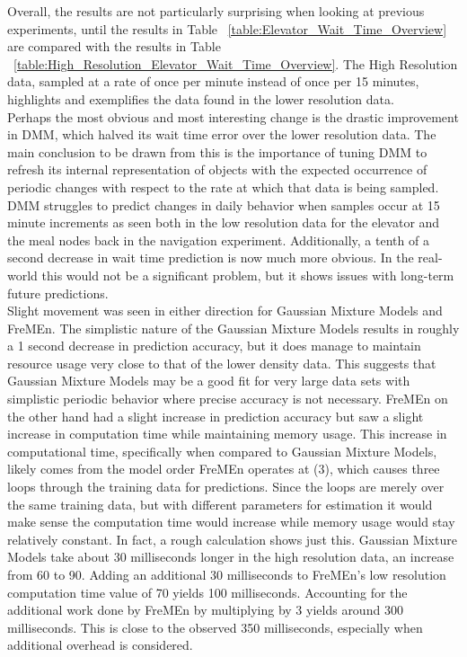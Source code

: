 \begin{center}
Overall, the results are not particularly surprising when looking at previous
experiments, until the results in Table
~\ref{table:Elevator_Wait_Time_Overview} are compared with the results in Table
~\ref{table:High_Resolution_Elevator_Wait_Time_Overview}. The High Resolution
data, sampled at a rate of once per minute instead of once per 15 minutes,
highlights and exemplifies the data found in the lower resolution data. \\

Perhaps the most obvious and most interesting change is the drastic improvement
in DMM, which halved its wait time error over the lower resolution data.
The main conclusion to be drawn from this is the importance of tuning DMM
to refresh its internal representation of objects with the expected occurrence
of periodic changes with respect to the rate at which that data is being
sampled. DMM struggles to predict changes in daily behavior when samples
occur at 15 minute increments as seen both in the low resolution data for the
elevator and the meal nodes back in the navigation experiment.
Additionally, a tenth of a second decrease in wait time prediction is now much more obvious.
In the real-world this would not be a significant problem,
but it shows issues with long-term future predictions. \\

Slight movement was seen in either direction for Gaussian Mixture Models and
FreMEn. The simplistic nature of the Gaussian Mixture Models results in roughly
a 1 second decrease in prediction accuracy, but it does manage to maintain resource
usage very close to that of the lower density data. This suggests that Gaussian
Mixture Models may be a good fit for very large data sets with simplistic
periodic behavior where precise accuracy is not necessary. FreMEn on the other
hand had a slight increase in prediction accuracy but saw a slight increase in
computation time while maintaining memory usage. This increase in
computational time, specifically when compared to Gaussian Mixture Models,
likely comes from the model order FreMEn operates at (3), which causes
three loops through the training data for predictions. Since the loops are
merely over the same training data, but with different parameters for estimation
it would make sense the computation time would increase while memory usage would
stay relatively constant. In fact, a rough calculation shows just this. Gaussian
Mixture Models take about 30 milliseconds longer in the high resolution data,
an increase from 60 to 90. Adding an additional 30 milliseconds to FreMEn's
low resolution computation time value of 70 yields 100 milliseconds. Accounting
for the additional work done by FreMEn by multiplying by 3 yields around 300
milliseconds. This is close to the observed 350 milliseconds, especially when
additional overhead is considered. \\


\end{center}
